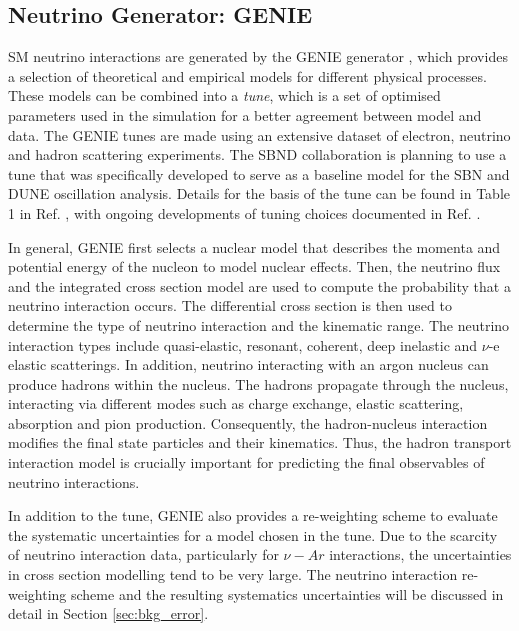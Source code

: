 \subsection{Neutrino Generator: GENIE}
\label{sec:gen_genie}

SM neutrino interactions are generated by the GENIE generator \cite{genie}, which provides a selection of theoretical and empirical models for different physical processes.
These models can be combined into a \textit{tune}, which is a set of optimised parameters used in the simulation for a better agreement between model and data.
The GENIE tunes are made using an extensive dataset of electron, neutrino and hadron scattering experiments.
The SBND collaboration is planning to use a tune that was specifically developed to serve as a baseline model for the SBN and DUNE oscillation analysis.
Details for the basis of the tune can be found in Table 1 in Ref. \cite{genie_tune}, with ongoing developments of tuning choices documented in Ref. \cite{genie_tune_github}.  

In general, GENIE first selects a nuclear model that describes the momenta and potential energy of the nucleon to model nuclear effects.                                                    
Then, the neutrino flux and the integrated cross section model are used to compute the probability that a neutrino interaction occurs.
The differential cross section is then used to determine the type of neutrino interaction and the kinematic range.
The neutrino interaction types include quasi-elastic, resonant, coherent, deep inelastic and $\nu$-e elastic scatterings.
In addition, neutrino interacting with an argon nucleus can produce hadrons within the nucleus.
The hadrons propagate through the nucleus, interacting via different modes such as charge exchange, elastic scattering, absorption and pion production.
Consequently, the hadron-nucleus interaction modifies the final state particles and their kinematics.
Thus, the hadron transport interaction model is crucially important for predicting the final observables of neutrino interactions.

In addition to the tune, GENIE also provides a re-weighting scheme to evaluate the systematic uncertainties for a model chosen in the tune.
Due to the scarcity of neutrino interaction data, particularly for $\nu-Ar$ interactions, the uncertainties in cross section modelling tend to be very large. 
The neutrino interaction re-weighting scheme and the resulting systematics uncertainties will be discussed in detail in Section \ref{sec:bkg_error}.

